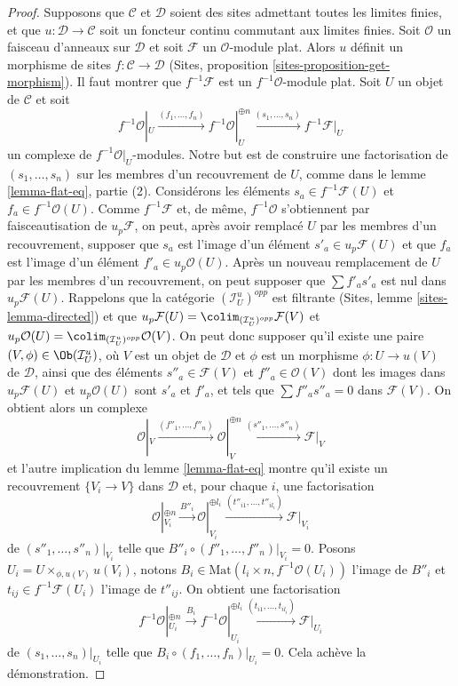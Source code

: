 \begin{proof}
\medskip\noindent
Supposons que $\mathcal{C}$ et $\mathcal{D}$ soient des sites admettant toutes
les limites finies, et que $u : \mathcal{D} \to \mathcal{C}$ soit un foncteur
continu commutant aux limites finies. Soit $\mathcal{O}$ un faisceau d'anneaux
sur $\mathcal{D}$ et soit $\mathcal{F}$ un $\mathcal{O}$-module plat. Alors $u$
définit un morphisme de sites $f : \mathcal{C} \to \mathcal{D}$
(Sites, proposition \ref{sites-proposition-get-morphism}). Il faut montrer que
$f^{-1}\mathcal{F}$ est un $f^{-1}\mathcal{O}$-module plat. Soit $U$ un objet
de $\mathcal{C}$ et soit
$$
f^{-1}\mathcal{O}|_U \xrightarrow{(f_1, \ldots, f_n)}
f^{-1}\mathcal{O}|_U^{\oplus n} \xrightarrow{(s_1, \ldots, s_n)}
f^{-1}\mathcal{F}|_U
$$
un complexe de $f^{-1}\mathcal{O}|_U$-modules. Notre but est de construire une
factorisation de $(s_1, \ldots, s_n)$ sur les membres d'un recouvrement de $U$,
comme dans le lemme \ref{lemma-flat-eq}, partie (2).
Considérons les éléments $s_a \in f^{-1}\mathcal{F}(U)$ et
$f_a \in f^{-1}\mathcal{O}(U)$. Comme $f^{-1}\mathcal{F}$ et, de même,
$f^{-1}\mathcal{O}$ s'obtiennent par faisceautisation de $u_p\mathcal{F}$, on
peut, après avoir remplacé $U$ par les membres d'un recouvrement, supposer que
$s_a$ est l'image d'un élément
$s'_a \in u_p\mathcal{F}(U)$ et que $f_a$ est l'image d'un élément
$f'_a \in u_p\mathcal{O}(U)$. Après un nouveau remplacement de $U$ par les
membres d'un recouvrement, on peut supposer que $\sum f'_as'_a$ est nul dans
$u_p\mathcal{F}(U)$. Rappelons que la catégorie
$(\mathcal{I}_U^u)^{opp}$ est filtrante
(Sites, lemme \ref{sites-lemma-directed}) et que
$u_p\mathcal{F}(U) = \colim_{(\mathcal{I}_U^u)^{opp}} \mathcal{F}(V)$ et
$u_p\mathcal{O}(U) = \colim_{(\mathcal{I}_U^u)^{opp}} \mathcal{O}(V)$.
On peut donc supposer qu'il existe une paire
$(V, \phi) \in \Ob(\mathcal{I}_U^u)$, où $V$ est un objet de $\mathcal{D}$ et
$\phi$ est un morphisme $\phi : U \to u(V)$ de $\mathcal{D}$, ainsi que des éléments
$s''_a \in \mathcal{F}(V)$ et $f''_a \in \mathcal{O}(V)$ dont les images dans
$u_p\mathcal{F}(U)$ et $u_p\mathcal{O}(U)$ sont $s'_a$ et $f'_a$, et tels que
$\sum f''_a s''_a = 0$ dans $\mathcal{F}(V)$. On obtient alors un complexe
$$
\mathcal{O}|_V \xrightarrow{(f''_1, \ldots, f''_n)}
\mathcal{O}|_V^{\oplus n} \xrightarrow{(s''_1, \ldots, s''_n)}
\mathcal{F}|_V
$$
et l'autre implication du lemme \ref{lemma-flat-eq} montre qu'il existe un
recouvrement $\{V_i \to V\}$ dans $\mathcal{D}$ et, pour chaque $i$, une factorisation
$$
\mathcal{O}|_{V_i}^{\oplus n}
\xrightarrow{B''_i}
\mathcal{O}|_{V_i}^{\oplus l_i} \xrightarrow{(t''_{i1}, \ldots, t''_{il_i})}
\mathcal{F}|_{V_i}
$$
de $(s''_1, \ldots, s''_n)|_{V_i}$ telle que
$B''_i \circ (f''_1, \ldots, f''_n)|_{V_i} = 0$.
Posons $U_i = U \times_{\phi, u(V)} u(V_i)$, notons
$B_i \in \text{Mat}(l_i \times n, f^{-1}\mathcal{O}(U_i))$ l'image de $B''_i$
et $t_{ij} \in f^{-1}\mathcal{F}(U_i)$ l'image de $t''_{ij}$. On obtient une factorisation
$$
f^{-1}\mathcal{O}|_{U_i}^{\oplus n}
\xrightarrow{B_i}
f^{-1}\mathcal{O}|_{U_i}^{\oplus l_i}
\xrightarrow{(t_{i1}, \ldots, t_{il_i})}
\mathcal{F}|_{U_i}
$$
de $(s_1, \ldots, s_n)|_{U_i}$ telle que
$B_i \circ (f_1, \ldots, f_n)|_{U_i} = 0$.
Cela achève la démonstration.
\end{proof}

